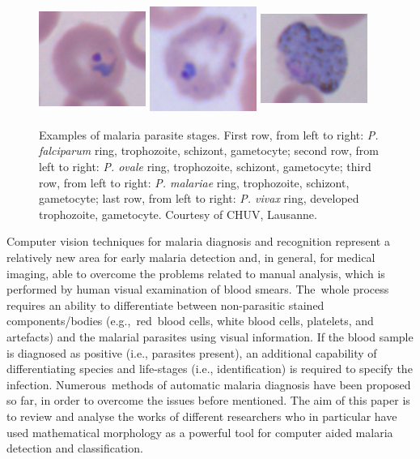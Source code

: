 \documentclass[sensors,review,accept,moreauthors,pdftex,10pt,a4paper]{mdpi}
\begin{document}
\begin{figure}[H]\ContinuedFloat
\centering	
	\includegraphics[width=3.5cm, height=3.5cm]{img/vivax_1_ring}
	\includegraphics[width=3.5cm, height=3.5cm]{img/vivax_2c_trophozoiteDeveloped}
	\includegraphics[width=3.5cm, height=3.5cm]{img/vivax_4_gametocyte}
	\caption{\label{fig:malaria_stages}Examples of malaria parasite stages.
		First row, from left to right: \emph{P. falciparum} ring, trophozoite, schizont, gametocyte;
		second row, from left to right: \emph{P. ovale} ring, trophozoite, schizont, gametocyte;
		third row, from left to right: \emph{P. malariae} ring, trophozoite, schizont, gametocyte;
		last row, from left to right: \emph{P. vivax} ring, developed trophozoite, gametocyte.
 Courtesy of CHUV, Lausanne.}
\end{figure}

Computer vision techniques for malaria diagnosis and recognition represent a relatively new area for early malaria detection and, in general, for medical imaging, able to overcome the problems related to manual analysis, which is performed by human visual examination of blood smears. The~whole process requires an ability to differentiate between non-parasitic stained components/bodies (e.g.,~red~blood cells, white blood cells, platelets, and artefacts) and the malarial parasites using visual information. If the blood sample is diagnosed as positive (i.e.,  parasites present), an additional capability of differentiating species and life-stages (i.e.,  identification) is required to specify the infection. Numerous~methods of automatic malaria diagnosis have been proposed so far, in order to overcome the issues before mentioned. The aim of this paper is to review and analyse the works of different researchers who in particular have used mathematical morphology as a powerful tool for computer aided malaria detection and classification.
\end{document}
